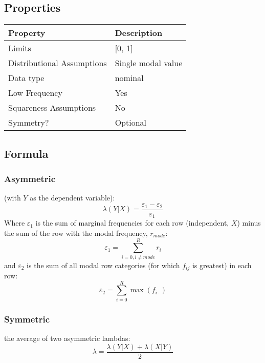 \documentclass[11pt]{article}
\begin{document}
\subsection{Properties}
\begin{tabular}{| l || l |}
    \hline
    {\bf Property} & {\bf Description} \\
    \hline
    Limits & [0, 1] \\ \hline

    Distributional Assumptions& Single modal value \\ \hline

    Data type & nominal \\ \hline

    Low Frequency & Yes \\ \hline

    Squareness Assumptions & No \\ \hline
    
    Symmetry? &  Optional \\ \hline

\end{tabular}


\subsection{Formula}
\subsubsection{Asymmetric}
(with $Y$ as the dependent variable):
$$
\lambda(Y|X) = \frac{ \varepsilon_1 - \varepsilon_2 }{ \varepsilon_1 }
$$
Where $\varepsilon_1$ is the sum of marginal frequencies for each row (independent, $X$) minus the sum of the row with the modal frequency, $r_{mode}$:
$$
\varepsilon_1 = \sum_{i=0, i \neq mode}^{R}{ r_i }
$$
and $\varepsilon_2$ is the sum of all modal row categories (for which $f_{ij}$ is greatest) in each row:
$$
\varepsilon_2 = \sum_{i=0}^{R}{ \max( f_{i\cdot} ) }
$$

\subsubsection{Symmetric}
the average of two asymmetric lambdas:
$$
\lambda = \frac{ \lambda(Y|X) + \lambda(X|Y) }{ 2 }
$$
\end{document}
